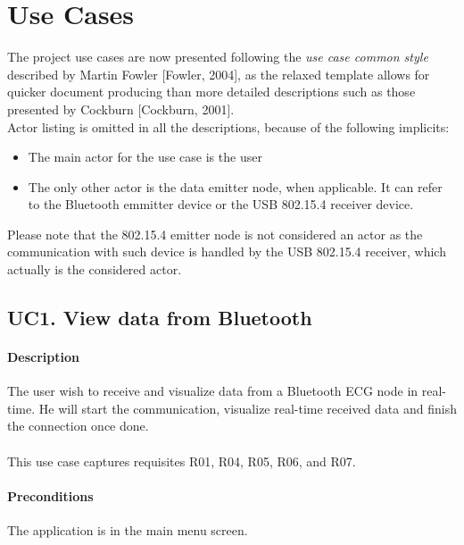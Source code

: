 	\section{Use Cases}
	\label{sec:sw-ucases}

		The project use cases are now presented following the \emph{use case common style} described by Martin Fowler [Fowler, 2004], as the relaxed template allows for quicker document producing than more detailed descriptions such as those presented by Cockburn [Cockburn, 2001].\\

		Actor listing is omitted in all the descriptions, because of the following implicits:
		\begin{itemize}
			\item The main actor for the use case is the user
			\item The only other actor is the data emitter node, when applicable. It can refer to the Bluetooth emmitter device or the USB 802.15.4 receiver device.
		\end{itemize}
		Please note that the 802.15.4 emitter node is not considered an actor as the communication with such device is handled by the USB 802.15.4 receiver, which actually is the considered actor.

		\subsection{UC1. View data from Bluetooth}

			\paragraph{Description} The user wish to receive and visualize data from a Bluetooth ECG node in real-time. He will start the communication, visualize real-time received data and finish the connection once done.\\
			\\This use case captures requisites R01, R04, R05, R06, and R07.

			\paragraph{Preconditions} The application is in the main menu screen.
